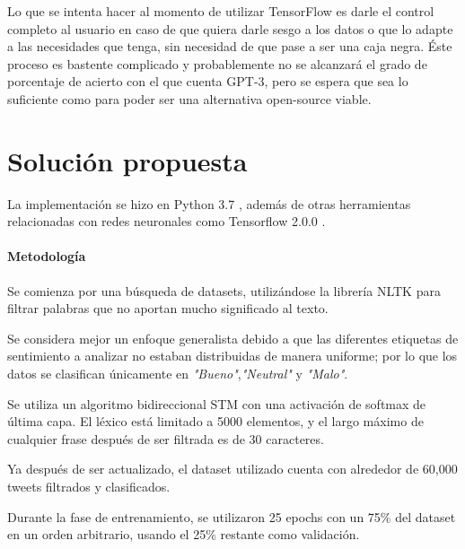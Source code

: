 \documentclass[a4]{sciposter}
\begin{document}
\begin{multicols}{3}
Lo que se intenta hacer al momento de utilizar TensorFlow es darle el control completo al usuario en caso de que quiera darle sesgo a los datos o que lo adapte a las necesidades que tenga, sin necesidad de que pase a ser una caja negra. Éste proceso es bastente complicado y probablemente no se alcanzará el grado de porcentaje de acierto con el que cuenta GPT-3, pero se espera que sea lo suficiente como para poder ser una alternativa open-source viable.



\section{Solución propuesta}
La implementación se hizo en Python 3.7 \citep{python}, además de otras herramientas relacionadas con redes neuronales como Tensorflow 2.0.0 \citep{tensorflow}.


\paragraph{Metodología}
Se comienza por una búsqueda de datasets, utilizándose la librería NLTK \citep{nltk} para filtrar palabras que no aportan mucho significado al texto.

Se considera mejor un enfoque generalista debido a que las diferentes etiquetas de sentimiento a analizar no estaban distribuidas de manera uniforme; por lo que los datos se clasifican únicamente en \textit{"Bueno"},\textit{"Neutral"} y \textit{"Malo"}.

Se utiliza un algoritmo bidireccional STM con una activación de softmax de última capa. El léxico está limitado a 5000 elementos, y el largo máximo de cualquier frase después de ser filtrada es de 30 caracteres.

Ya después de ser actualizado, el dataset utilizado cuenta con alrededor de 60,000 tweets filtrados y clasificados.

Durante la fase de entrenamiento, se utilizaron 25 epochs con un 75\% del dataset en un orden arbitrario, usando el 25\% restante como validación.


\end{multicols}
\end{document}
